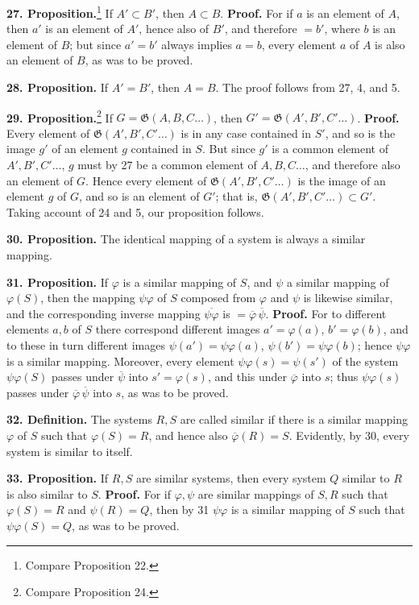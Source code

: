 \documentclass[11pt]{article}
\newcommand{\Gf}{\mathfrak{G}}
\newcommand{\partof}{\mathrel{\subset}}
\begin{document}
\noindent\textbf{27. Proposition.}\footnote{Compare Proposition 22.} If $A'\partof B'$, then $A\partof B$. \textbf{Proof.} For if $a$ is an element of $A$, then $a'$ is an element of $A'$, hence also of $B'$, and therefore $=b'$, where $b$ is an element of $B$; but since $a'=b'$ always implies $a=b$, every element $a$ of $A$ is also an element of $B$, as was to be proved.

\noindent\textbf{28. Proposition.} If $A'=B'$, then $A=B$. The proof follows from 27, 4, and 5.

\noindent\textbf{29. Proposition.}\footnote{Compare Proposition 24.} If $G=\Gf(A,B,C\ldots)$, then $G'=\Gf(A',B',C'\ldots)$. \textbf{Proof.} Every element of $\Gf(A',B',C'\ldots)$ is in any case contained in $S'$, and so is the image $g'$ of an element $g$ contained in $S$. But since $g'$ is a common element of $A',B',C'\ldots$, $g$ must by 27 be a common element of $A,B,C\ldots$, and therefore also an element of $G$. Hence every element of $\Gf(A',B',C'\ldots)$ is the image of an element $g$ of $G$, and so is an element of $G'$; that is, $\Gf(A',B',C'\ldots)\partof G'$. Taking account of 24 and 5, our proposition follows.

\noindent\textbf{30. Proposition.} The identical mapping of a system is always a similar mapping.

\noindent\textbf{31. Proposition.} If $\varphi$ is a similar mapping of $S$, and $\psi$ a similar mapping of $\varphi(S)$, then the mapping $\psi\varphi$ of $S$ composed from $\varphi$ and $\psi$ is likewise similar, and the corresponding inverse mapping $\overline{\psi\varphi}$ is $=\overline{\varphi}\,\overline{\psi}$. \textbf{Proof.} For to different elements $a,b$ of $S$ there correspond different images $a'=\varphi(a)$, $b'=\varphi(b)$, and to these in turn different images $\psi(a')=\psi\varphi(a)$, $\psi(b')=\psi\varphi(b)$; hence $\psi\varphi$ is a similar mapping. Moreover, every element $\psi\varphi(s)=\psi(s')$ of the system $\psi\varphi(S)$ passes under $\overline{\psi}$ into $s'=\varphi(s)$, and this under $\overline{\varphi}$ into $s$; thus $\psi\varphi(s)$ passes under $\overline{\varphi}\,\overline{\psi}$ into $s$, as was to be proved.

\noindent\textbf{32. Definition.} The systems $R,S$ are called similar if there is a similar mapping $\varphi$ of $S$ such that $\varphi(S)=R$, and hence also $\overline{\varphi}(R)=S$. Evidently, by 30, every system is similar to itself.

\noindent\textbf{33. Proposition.} If $R,S$ are similar systems, then every system $Q$ similar to $R$ is also similar to $S$. \textbf{Proof.} For if $\varphi,\psi$ are similar mappings of $S,R$ such that $\varphi(S)=R$ and $\psi(R)=Q$, then by 31 $\psi\varphi$ is a similar mapping of $S$ such that $\psi\varphi(S)=Q$, as was to be proved.
\end{document}
